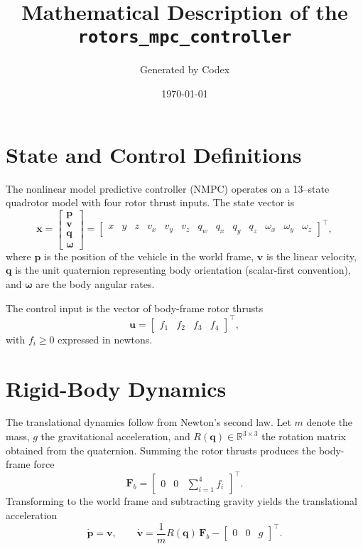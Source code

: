 \documentclass[11pt,a4paper]{article}
\title{Mathematical Description of the \texttt{rotors\_mpc\_controller}}
\author{Generated by Codex}
\date{\today}
\begin{document}
\maketitle

\section{State and Control Definitions}

The nonlinear model predictive controller (NMPC) operates on a 13--state quadrotor model with four rotor thrust inputs. The state vector is
\begin{equation}
    \bm{x} = \begin{bmatrix}
        \bm{p} \\
        \bm{v} \\
        \bm{q} \\
        \bm{\omega}
    \end{bmatrix} 
    = \begin{bmatrix}
        x & y & z & v_x & v_y & v_z & q_w & q_x & q_y & q_z & \omega_x & \omega_y & \omega_z
    \end{bmatrix}^\top,
\end{equation}
where $\bm{p}$ is the position of the vehicle in the world frame, $\bm{v}$ is the linear velocity, $\bm{q}$ is the unit quaternion representing body orientation (scalar-first convention), and $\bm{\omega}$ are the body angular rates.

The control input is the vector of body-frame rotor thrusts
\begin{equation}
    \bm{u} = \begin{bmatrix} f_1 & f_2 & f_3 & f_4 \end{bmatrix}^\top,
\end{equation}
with $f_i \ge 0$ expressed in newtons.

\section{Rigid-Body Dynamics}

The translational dynamics follow from Newton's second law. Let $m$ denote the mass, $g$ the gravitational acceleration, and $R(\bm{q}) \in \mathbb{R}^{3\times3}$ the rotation matrix obtained from the quaternion. Summing the rotor thrusts produces the body-frame force
\begin{equation}
    \bm{F}_b = \begin{bmatrix} 0 & 0 & \sum_{i=1}^4 f_i \end{bmatrix}^\top.
\end{equation}
Transforming to the world frame and subtracting gravity yields the translational acceleration
\begin{equation}
    \dot{\bm{p}} = \bm{v}, \qquad
    \dot{\bm{v}} = \frac{1}{m} R(\bm{q})\,\bm{F}_b - \begin{bmatrix}0 & 0 & g \end{bmatrix}^\top.
\end{equation}
\end{document}
